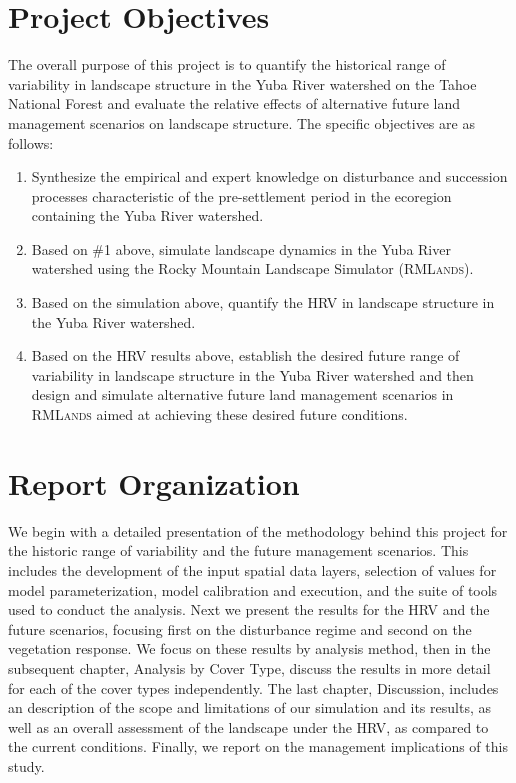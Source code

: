 \section{Project Objectives}
The overall purpose of this project is to quantify the historical range of variability in landscape structure in the Yuba River watershed on the Tahoe National Forest and evaluate the relative effects of  alternative future land management scenarios on landscape structure. The specific objectives are as follows:
\begin{enumerate}
	\item Synthesize the empirical and expert knowledge on disturbance and succession processes characteristic of the pre-settlement period in the ecoregion containing the Yuba River watershed.
	\item Based on \#1 above, simulate landscape dynamics in the Yuba River watershed using the Rocky Mountain Landscape Simulator (\textsc{RMLands}).
	\item Based on the simulation above, quantify the HRV in landscape structure in the Yuba River watershed.
	\item Based on the HRV results above, establish the desired future range of variability in landscape structure in the Yuba River watershed and then design and simulate alternative future land management scenarios in \textsc{RMLands} aimed at achieving these desired future conditions.
\end{enumerate}


\section{Report Organization}

We begin with a detailed presentation of the methodology behind this project for the historic range of variability and the future management scenarios. This includes the development of the input spatial data layers, selection of values for model parameterization, model calibration and execution, and the suite of tools used to conduct the analysis. Next we present the results for the HRV and the future scenarios, focusing first on the disturbance regime and second on the vegetation response. We focus on these results by analysis method, then in the subsequent chapter, Analysis by Cover Type, discuss the results in more detail for each of the cover types independently. The last chapter, Discussion, includes an description of the scope and limitations of our simulation and its results, as well as an overall assessment of the landscape under the HRV, as compared to the current conditions. Finally, we report on the management implications of this study.
